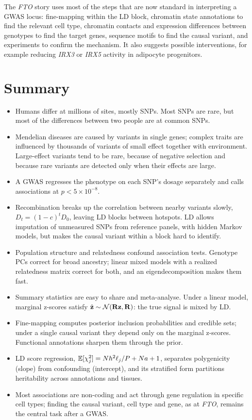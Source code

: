 The \textit{FTO} story uses most of the steps that are now standard in interpreting a GWAS locus: fine-mapping within the LD block, chromatin state annotations to find the relevant cell type, chromatin contacts and expression differences between genotypes to find the target genes, sequence motifs to find the causal variant, and experiments to confirm the mechanism. It also suggests possible interventions, for example reducing \textit{IRX3} or \textit{IRX5} activity in adipocyte progenitors.

\section{Summary}

\begin{itemize}
  \item Humans differ at millions of sites, mostly SNPs. Most SNPs are rare, but most of the differences between two people are at common SNPs.
  \item Mendelian diseases are caused by variants in single genes; complex traits are influenced by thousands of variants of small effect together with environment. Large-effect variants tend to be rare, because of negative selection and because rare variants are detected only when their effects are large.
  \item A GWAS regresses the phenotype on each SNP's dosage separately and calls associations at $p<5\times10^{-8}$.
  \item Recombination breaks up the correlation between nearby variants slowly, $D_t=(1-c)^tD_0$, leaving LD blocks between hotspots. LD allows imputation of unmeasured SNPs from reference panels, with hidden Markov models, but makes the causal variant within a block hard to identify.
  \item Population structure and relatedness confound association tests. Genotype PCs correct for broad ancestry; linear mixed models with a realized relatedness matrix correct for both, and an eigendecomposition makes them fast.
  \item Summary statistics are easy to share and meta-analyse. Under a linear model, marginal z-scores satisfy $\hat{\mathbf{z}}\sim\mathcal{N}(\mathbf{R}\mathbf{z},\mathbf{R})$: the true signal is mixed by LD.
  \item Fine-mapping computes posterior inclusion probabilities and credible sets; under a single causal variant they depend only on the marginal z-scores. Functional annotations sharpen them through the prior.
  \item LD score regression, $\mathbb{E}[\chi^2_j]=Nh^2\ell_j/P+Na+1$, separates polygenicity (slope) from confounding (intercept), and its stratified form partitions heritability across annotations and tissues.
  \item Most associations are non-coding and act through gene regulation in specific cell types; finding the causal variant, cell type and gene, as at \textit{FTO}, remains the central task after a GWAS.
\end{itemize}

